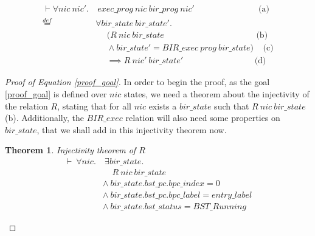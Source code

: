 \documentclass{kththesis}
\newcommand{\eqdef}{\stackrel{def}{=}}
\newtheorem{theorem}{Theorem}[section]
\begin{document}
{\begin{small}
\begin{equation}
\begin{split}
  \vdash \forall nic~nic'. &~exec\_prog~nic~bir\_prog~nic' ~~~~~~~~~~~~~~~~~~~~~~~~~~~~~~~~~~ \text{(a)}\\
    \eqdef~&\forall bir\_state~bir\_state'.\\
          & ~~~~~~ (R~nic~bir\_state ~~~~~~~~~~~~~~~~~~~~~~~~~~~~~~~~~~~~~~~~~~~~~~~~~ \text{(b)}\\
          & ~~~~~~ \land bir\_state' = BIR\_exec~prog~bir\_state) ~~~~~ \text{(c)}\\
          & ~~~~~~ \implies R~nic'~bir\_state' ~~~~~~~~~~~~~~~~~~~~~~~~~~~~~~~~~~~~~~ \text{(d)}
\end{split}
\label{proof_eq_thm}
\end{equation}
\end{small}

\begin{proof}[Proof of Equation \ref{proof_goal}]



In order to begin the proof, as the goal \ref{proof_goal} is defined over $nic$ states, we need a theorem about the injectivity of the relation $R$, stating that for all $nic$ exists a $bir\_state$ such that $R~nic~bir\_state$ (b). Additionally, the $BIR\_exec$ relation will also need some properties on $bir\_state$, that we shall add in this injectivity theorem now.

\begin{theorem} \label{proof_R_inj_thm}
Injectivity theorem of $R$
\begin{equation*} \label{proof_R_inj_thm_eq}
\begin{split}
    \vdash~\forall nic.&~\exists bir\_state.\\
    		&~~~~~R~nic~bir\_state\\
		&\land~bir\_state.bst\_pc.bpc\_index = 0\\
		&\land~bir\_state.bst\_pc.bpc\_label = entry\_label\\
		&\land~bir\_state.bst\_status = BST\_Running
\end{split}
\end{equation*}
\end{theorem}


\end{proof}}
\end{document}
